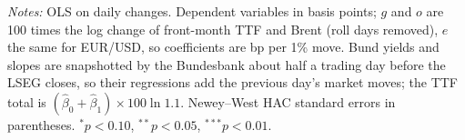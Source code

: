 \documentclass[11pt,a4paper]{article}
\begin{document}
\begin{table}[htbp]
\par\vspace{4pt}\begin{minipage}{0.94\textwidth}\scriptsize\textit{Notes:} OLS on daily changes. Dependent variables in basis points; $g$ and $o$ are 100 times the log change of front-month TTF and Brent (roll days removed), $e$ the same for EUR/USD, so coefficients are bp per 1\% move. Bund yields and slopes are snapshotted by the Bundesbank about half a trading day before the LSEG closes, so their regressions add the previous day's market moves; the TTF total is $(\hat\beta_0+\hat\beta_1)\times 100\ln 1.1$. Newey--West HAC standard errors in parentheses. $^{*}p<0.10$, $^{**}p<0.05$, $^{***}p<0.01$.\end{minipage}
\end{table}
\end{document}
